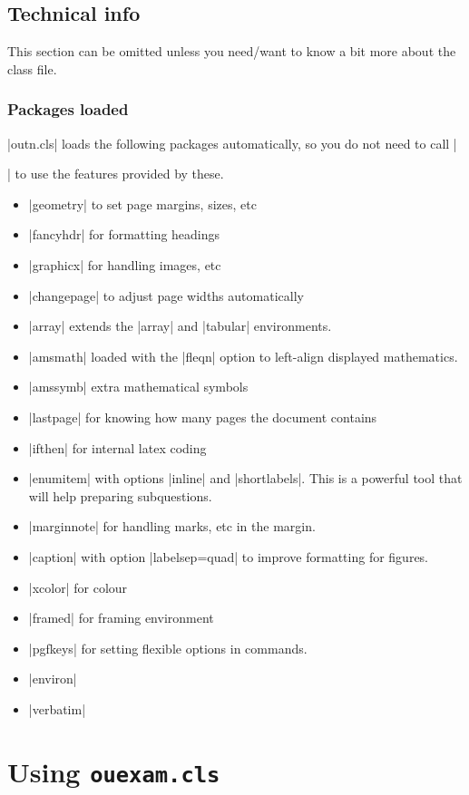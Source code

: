 \documentclass[a4paper]{ltxguide}
\newcommand\3{\unskip\enspace\fbox{\fontsize{4}{4}\selectfont NEW 3.0}}
\begin{document}
\subsection{Technical info}
This section can be omitted unless you need/want to know a bit more about the class file.

\subsubsection{Packages loaded}
|outn.cls| loads the following packages automatically, so you do not need to call |\usepackage{...}| to use the features provided by these.

\begin{itemize}
\item |geometry| to set page margins, sizes, etc
\item |fancyhdr| for formatting headings
\item |graphicx| for handling images, etc
\item |changepage| to adjust page widths automatically
\item |array| extends the |array| and |tabular| environments.
\item |amsmath| loaded with the |fleqn| option to left-align displayed mathematics.
\item |amssymb| extra mathematical symbols
\item |lastpage| for knowing how many pages the document contains
\item |ifthen| for internal latex coding
\item |enumitem| with options |inline| and |shortlabels|. This is a powerful tool that will help preparing subquestions.
\item |marginnote| for handling marks, etc in the margin.
\item |caption| with option |labelsep=quad| to improve formatting for figures.
\item |xcolor| for colour
\item |framed| for framing environment
\item |pgfkeys| for setting flexible options in commands.
\item |environ|
\item |verbatim|
\end{itemize}



%
%
%
%
%
%
%
%
%
%
\section{Using \texttt{ouexam.cls}}
\end{document}
